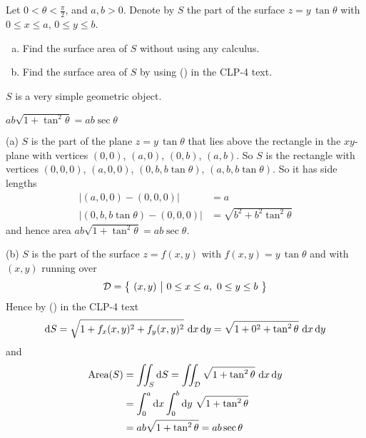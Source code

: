 

\subsection*{\Conceptual}
\begin{question}
Let $0<\theta<\frac{\pi}{2}$, and $a,b>0$. Denote by $S$ the part of 
the surface $z=y\,\tan\theta$ with $0\le x\le a$, $0\le y\le b$.
\begin{enumerate}[(a)]
\item 
Find the surface area of $S$ without using any calculus.
\item
Find the surface area of $S$ by using ()
in the CLP-4 text.
\end{enumerate}

\end{question}

\begin{hint} 
$S$ is a very simple geometric object.
\end{hint}

\begin{answer} 
$ab\sqrt{1+\tan^2\theta}=ab\sec\theta$
\end{answer}

\begin{solution}
(a) $S$ is the part of the plane $z=y\,\tan\theta$ that lies above the 
rectangle in the $xy$-plane with vertices $(0,0)$, $(a,0)$, $(0,b)$, $(a,b)$. 
So $S$ is the rectangle with vertices $(0,0,0)$, 
$(a,0,0)$, $(0,b,b\tan\theta)$, $(a,b,b\tan\theta)$. So it has side lengths
\begin{align*}
|(a,0,0) -(0,0,0)| &=a \\
|(0,b,b\tan\theta) - (0,0,0)| &=  \sqrt{b^2+b^2\tan^2\theta}
\end{align*}
and hence area $ab\sqrt{1+\tan^2\theta}=ab\sec\theta$.

(b) $S$ is the part of the surface $z=f(x,y)$ with $f(x,y) = y\,\tan\theta$
and with $(x,y)$ running over
\begin{equation*}
\cD =\Set{(x,y)}{0\le x\le a,\ 0\le y\le b}
\end{equation*}
Hence by () in the CLP-4 text
\begin{equation*}
\dee{S} = \sqrt{1+f_x(x,y)^2+f_y(x,y)^2}\ \dee{x}\,\dee{y}
        = \sqrt{1+0^2+\tan^2\theta}\ \dee{x}\,\dee{y}
\end{equation*}
and 
\begin{align*}
\text{Area}(S)&=\iint_S\mathrm{d}S
=\iint_{\mathcal{D}} \sqrt{1+\tan^2\theta}\ \mathrm{d}x\,\mathrm{d}y  \\
&=\int_0^a\mathrm{d}x\int_0^b\mathrm{d}y\ \sqrt{1+\tan^2\theta} \\
&=ab\sqrt{1+\tan^2\theta}=ab\sec\theta
\end{align*}

\end{solution}



